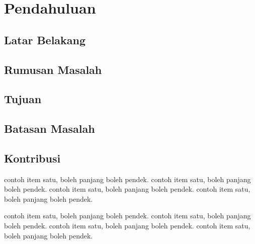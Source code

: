 \docContentSpacing

\chapter{Pendahuluan}

\setcounter{page}{1}

\section{Latar Belakang}{
    \lipsum[1-2]
}

\section{Rumusan Masalah}{
    \lipsum[3]
}

\section{Tujuan}{
    \lipsum[5-6]
}

\section{Batasan Masalah}{
    \lipsum[7-8]
}

\section{Kontribusi}{
    \lipsum[2]
    \begin{f_itemize}
        \item contoh item satu, boleh panjang boleh pendek. contoh item satu, boleh panjang boleh pendek. contoh item satu, boleh panjang boleh pendek. contoh item satu, boleh panjang boleh pendek.
        \item contoh item satu, boleh panjang boleh pendek. contoh item satu, boleh panjang boleh pendek. contoh item satu, boleh panjang boleh pendek. contoh item satu, boleh panjang boleh pendek.
    \end{f_itemize}
}